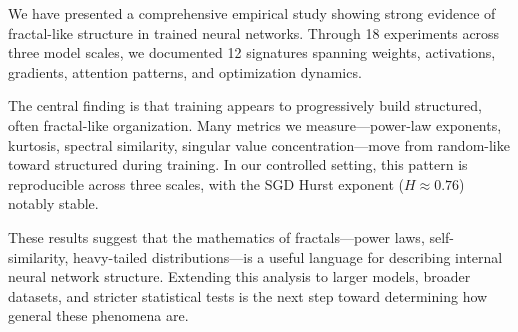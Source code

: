 \documentclass[11pt,a4paper]{article}
\begin{document}
We have presented a comprehensive empirical study showing strong evidence of fractal-like structure in trained neural networks. Through 18 experiments across three model scales, we documented 12 signatures spanning weights, activations, gradients, attention patterns, and optimization dynamics.

The central finding is that training appears to progressively build structured, often fractal-like organization. Many metrics we measure---power-law exponents, kurtosis, spectral similarity, singular value concentration---move from random-like toward structured during training. In our controlled setting, this pattern is reproducible across three scales, with the SGD Hurst exponent ($H \approx 0.76$) notably stable.

These results suggest that the mathematics of fractals---power laws, self-similarity, heavy-tailed distributions---is a useful language for describing internal neural network structure. Extending this analysis to larger models, broader datasets, and stricter statistical tests is the next step toward determining how general these phenomena are.



\end{document}
